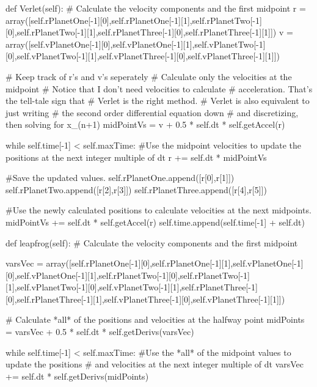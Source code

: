 \begin{enumerate}
\begin{codeexample}
\begin{VerbatimOut}{\listingFile}
    def Verlet(self):
        # Calculate the velocity components and the first midpoint
        r = array([self.rPlanetOne[-1][0],self.rPlanetOne[-1][1],self.rPlanetTwo[-1][0],self.rPlanetTwo[-1][1],self.rPlanetThree[-1][0],self.rPlanetThree[-1][1]])
        v = array([self.vPlanetOne[-1][0],self.vPlanetOne[-1][1],self.vPlanetTwo[-1][0],self.vPlanetTwo[-1][1],self.vPlanetThree[-1][0],self.vPlanetThree[-1][1]])

        # Keep track of r's and v's seperately 
        # Calculate only the velocities at the midpoint
        # Notice that I don't need velocities to calculate
        # acceleration. That's the tell-tale sign that
        # Verlet is the right method.
        # Verlet is also equivalent to just writing
        # the second order differential equation down
        # and discretizing, then solving for x_(n+1)
        midPointVs = v + 0.5 * self.dt * self.getAccel(r)

        while self.time[-1] < self.maxTime:
            #Use the midpoint velocities to update the positions at the next integer multiple of dt
            r +=  self.dt * midPointVs
            
            #Save the updated values.
            self.rPlanetOne.append([r[0],r[1]])
            self.rPlanetTwo.append([r[2],r[3]])
            self.rPlanetThree.append([r[4],r[5]])

            #Use the newly calculated positions to calculate velocities at the next midpoints. 
            midPointVs += self.dt * self.getAccel(r)
            self.time.append(self.time[-1] + self.dt)

    def leapfrog(self):
        # Calculate the velocity components and the first midpoint
        

        varsVec =  array([self.rPlanetOne[-1][0],self.rPlanetOne[-1][1],self.vPlanetOne[-1][0],self.vPlanetOne[-1][1],self.rPlanetTwo[-1][0],self.rPlanetTwo[-1][1],self.vPlanetTwo[-1][0],self.vPlanetTwo[-1][1],self.rPlanetThree[-1][0],self.rPlanetThree[-1][1],self.vPlanetThree[-1][0],self.vPlanetThree[-1][1]])
        
        # Calculate *all* of the positions and velocities at the halfway point
        midPoints = varsVec + 0.5 * self.dt * self.getDerivs(varsVec)

        while self.time[-1] < self.maxTime:
            #Use the *all* of the midpoint values to update the positions
            # and velocities at the next integer multiple of dt
            varsVec +=  self.dt * self.getDerivs(midPoints)
            

\end{VerbatimOut}
\end{codeexample}
\end{enumerate}

